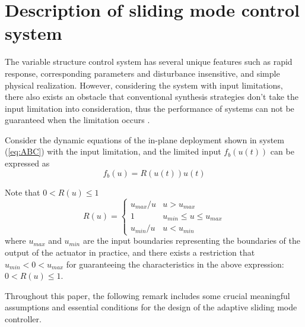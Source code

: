 \documentclass[3p]{elsarticle}
\theoremstyle{plain}
\begin{document}
\section{Description of sliding mode control system}\label{sec:SMC}
The variable structure control system has several unique features such as rapid response, corresponding parameters and disturbance insensitive, and simple physical realization. However, considering the system with input limitations, there also exists an obstacle that conventional synthesis strategies don't take the input limitation into consideration, thus the performance of systems can not be guaranteed when the limitation occurs \cite{Hu2008Robust}.\par
Consider the dynamic equations of the in-plane deployment shown in system (\ref{eq:ABC}) with the input limitation, and the limited input $f_{b}(u(t))$ can be expressed as
\begin{equation}
f_b(u)=R(u(t))u(t)\label{eq:satu}
\end{equation}\par
Note that $0 < R(u) \le 1$
\begin{equation}
R(u) =\begin{cases}
u_{max}/u   & u > u_{max}\\
1           & u_{min} \le u \le u_{max}\\
u_{min}/u   & u < u_{min}
\end{cases}\label{eq:ru}
\end{equation}
where $u_{max}$ and $u_{min}$ are the input boundaries representing the boundaries of the output of the actuator in practice, and there exists a restriction that $u_{min}<0<u_{max}$ for guaranteeing the characteristics in the above expression: $0<R(u)\le 1$. \par
Throughout this paper, the following remark includes some crucial meaningful assumptions and essential conditions for the design of the adaptive sliding mode controller.
\end{document}
